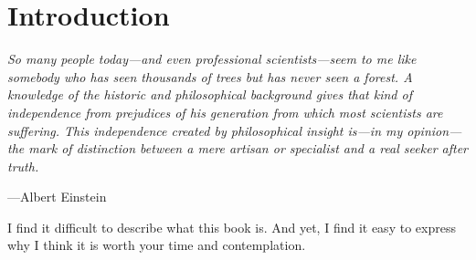 \chapter{Introduction}

\vspace{4mm}
\begin{displayquote}
    \textit{So many people today---and even professional scientists---seem to me like somebody who has seen thousands of trees but has never seen a forest. A knowledge of the historic and philosophical background gives that kind of independence from prejudices of his generation from which most scientists are suffering. This independence created by philosophical insight is---in my opinion---the mark of distinction between a mere artisan or specialist and a real seeker after truth.}
    \vspace{2mm}
    \begin{flushright}
	---Albert Einstein
    \end{flushright}
\end{displayquote}
\vspace{4mm}

I find it difficult to describe what this book is. And yet, I find it easy to express why I think it is worth your time and contemplation.


